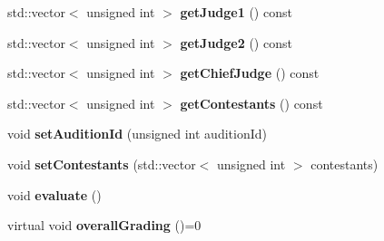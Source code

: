 \begin{DoxyCompactItemize}
\item 
\mbox{\label{class_fase_a1b3af27fb8ea617bf9ed88d53b33f56e}} 
std\+::vector$<$ unsigned int $>$ {\bfseries get\+Judge1} () const
\item 
\mbox{\label{class_fase_aebfe4fdf55798d2065ef425baf6ac643}} 
std\+::vector$<$ unsigned int $>$ {\bfseries get\+Judge2} () const
\item 
\mbox{\label{class_fase_a1de92f73f196f6bd183a23bcc98eec79}} 
std\+::vector$<$ unsigned int $>$ {\bfseries get\+Chief\+Judge} () const
\item 
\mbox{\label{class_fase_a25b917f087fcb3091ec82e165a2a0504}} 
std\+::vector$<$ unsigned int $>$ {\bfseries get\+Contestants} () const
\item 
\mbox{\label{class_fase_ac5b33fc102c82292a7ceb1c536744f1b}} 
void {\bfseries set\+Audition\+Id} (unsigned int audition\+Id)
\item 
\mbox{\label{class_fase_a5f182b1a4e7e0113157278d573679b08}} 
void {\bfseries set\+Contestants} (std\+::vector$<$ unsigned int $>$ contestants)
\item 
\mbox{\label{class_fase_ab36057ace87728ef9f72a94a17bb0706}} 
void {\bfseries evaluate} ()
\item 
\mbox{\label{class_fase_a594a6fbd46a8d76bc798f526441b5f73}} 
virtual void {\bfseries overall\+Grading} ()=0
\end{DoxyCompactItemize}
